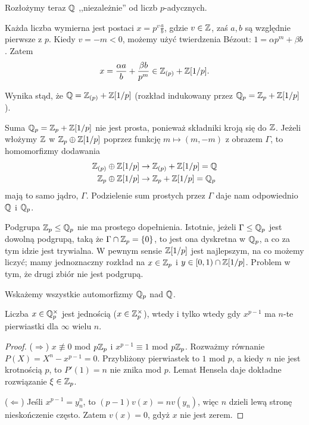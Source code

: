 Rozłożymy teraz $\mathbb Q$ ,,niezależnie'' od liczb $p$-adycznych.

Każda liczba wymierna jest postaci $x = p^v \frac a b$, gdzie $v \in \mathbb Z$, zaś $a, b$ są względnie pierwsze z $p$.
Kiedy $v = -m < 0$, możemy użyć twierdzenia Bézout: $1 = \alpha p^m + \beta b$.
Zatem
\[
	x = \frac{\alpha a}{b} + \frac{\beta b}{p^m} \in \mathbb Z_{(p)} + \mathbb Z[1/p].
\]

Wynika stąd, że $\mathbb Q = \mathbb Z_{(p)} + \mathbb Z[1/p]$ (rozkład indukowany przez $\mathbb Q_p = \mathbb Z_p + \mathbb Z[1/p]$).

Suma $\mathbb Q_p = \mathbb Z_p + \mathbb Z[1/p]$ nie jest prosta, ponieważ składniki kroją się do $\mathbb Z$.
Jeżeli włożymy $\mathbb Z$ w $\mathbb Z_p \oplus \mathbb Z[1/p]$ poprzez funkcję $m \mapsto (m, -m)$ z obrazem $\Gamma$, to homomorfizmy dodawania 
\begin{align*}
	\mathbb Z_{(p)} \oplus \mathbb Z[1/p] & \to \mathbb Z_{(p)} + \mathbb Z[1/p] = \mathbb Q \\
	\mathbb Z_p \oplus \mathbb Z[1/p] & \to \mathbb Z_p + \mathbb Z[1/p] = \mathbb Q_p
\end{align*}
mają to samo jądro, $\Gamma$.
Podzielenie sum prostych przez $\Gamma$ daje nam odpowiednio $\mathbb Q$ i $\mathbb Q_p$.

Podgrupa $\mathbb Z_p \le \mathbb Q_p$ nie ma prostego dopełnienia.
Istotnie, jeżeli $\Gamma \le \mathbb Q_p$ jest dowolną podgrupą, taką że $\Gamma \cap \mathbb Z_p = \{0\}$, to jest ona dyskretna w $\mathbb Q_p$, a co za tym idzie jest trywialna.
W pewnym sensie $\mathbb Z[1/p]$ jest najlepszym, na co możemy liczyć; mamy jednoznaczny rozkład na $x \in \mathbb Z_p$ i $y \in [0,1) \cap \mathbb Z[1/p]$.
Problem w tym, że drugi zbiór nie jest podgrupą.

Wskażemy wszystkie automorfizmy $\mathbb Q_p$ nad $\mathbb Q$.

\begin{lemat}
	Liczba $x \in \mathbb Q_p^\times$ jest jednością ($x \in \mathbb Z_p^\times$), wtedy i tylko wtedy gdy $x^{p-1}$ ma $n$-te pierwiastki dla $\infty$ wielu $n$.
\end{lemat}

\begin{proof}
	($\Rightarrow$)
	$x \not \equiv 0$ mod $p\mathbb Z_p$ i $x^{p-1} \equiv 1$ mod $p \mathbb Z_p$.
	Rozważmy równanie $P(X) = X^n-x^{p-1} = 0$.
	Przybliżony pierwiastek to $1$ mod $p$, a kiedy $n$ nie jest krotnością $p$, to $P'(1) = n$ nie znika mod $p$.
	Lemat Hensela daje dokładne rozwiązanie $\xi \in \mathbb Z_p$.

	($\Leftarrow$) Jeśli $x^{p-1} = y_n^n$, to $(p-1)v(x) = n v(y_n)$, więc $n$ dzieli lewą stronę nieskończenie często.
	Zatem $v(x) = 0$, gdyż $x$ nie jest zerem.
\end{proof}

